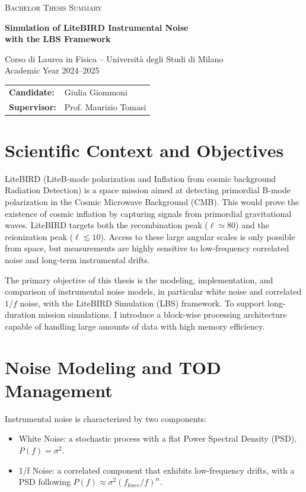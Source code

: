 \documentclass{article}
\begin{document}
\begin{center}
  {\Large\textsc{Bachelor Thesis Summary}\par}\vfill %
  {\LARGE\bfseries Simulation of LiteBIRD Instrumental Noise \\ with the LBS Framework \par}\vfill 
  {\large Corso di Laurea in Fisica -- Università degli Studi di Milano\\
  Academic Year 2024--2025\par}
\end{center}

{\large
  \begin{tabular}{@{}l l@{}}
    \textbf{Candidate:}  & Giulia Giommoni \\ 
    \textbf{Supervisor:} & Prof. Maurizio Tomasi \\
  \end{tabular}
}



\section*{Scientific Context and Objectives}
LiteBIRD (LiteB-mode polarization and Inflation from cosmic background Radiation Detection) is a space mission aimed at detecting primordial B-mode polarization in the Cosmic Microwave Background (CMB). This would prove the existence of cosmic inflation by capturing signals from primordial gravitational waves. LiteBIRD targets both the recombination peak ($\ell \simeq 80$) and the reionization peak ($\ell \lesssim 10$). Access to these large angular scales is only possible from space, but measurements are highly sensitive to low-frequency correlated noise and long-term instrumental drifts.

The primary objective of this thesis is the modeling, implementation, and comparison of instrumental noise models, in particular white noise and correlated $1/f$ noise, with the LiteBIRD Simulation (LBS) framework. To support long-duration mission simulations, I introduce a block-wise processing architecture capable of handling large amounts of data with high memory efficiency.



\section*{Noise Modeling and TOD Management}
Instrumental noise is characterized by two components: 
\begin{itemize}
    \item White Noise: a stochastic process with a flat Power Spectral Density (PSD), $P(f) = \sigma^2$.
    \item 1/f Noise: a correlated component that exhibits low-frequency drifts, with a PSD following $P(f) \approx \sigma^2(f_{knee}/f)^\alpha$.
\end{itemize}
\end{document}

